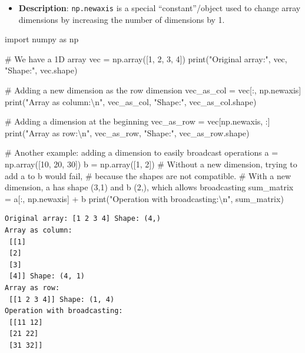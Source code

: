 \documentclass[
  english,
  letterpaper,
  DIV=11,
  numbers=noendperiod]{scrreprt}
\newenvironment{Shaded}{\begin{snugshade}}{\end{snugshade}}
\newcommand{\BuiltInTok}[1]{\textcolor[rgb]{0.00,0.23,0.31}{#1}}
\newcommand{\CharTok}[1]{\textcolor[rgb]{0.13,0.47,0.30}{#1}}
\newcommand{\CommentTok}[1]{\textcolor[rgb]{0.37,0.37,0.37}{#1}}
\newcommand{\DecValTok}[1]{\textcolor[rgb]{0.68,0.00,0.00}{#1}}
\newcommand{\ImportTok}[1]{\textcolor[rgb]{0.00,0.46,0.62}{#1}}
\newcommand{\NormalTok}[1]{\textcolor[rgb]{0.00,0.23,0.31}{#1}}
\newcommand{\OperatorTok}[1]{\textcolor[rgb]{0.37,0.37,0.37}{#1}}
\newcommand{\StringTok}[1]{\textcolor[rgb]{0.13,0.47,0.30}{#1}}
\providecommand{\tightlist}{%
  \setlength{\itemsep}{0pt}\setlength{\parskip}{0pt}}
\begin{document}
\begin{itemize}
\tightlist
\item
  \textbf{Description}: \texttt{np.newaxis} is a special
  ``constant''/object used to change array dimensions by increasing the
  number of dimensions by 1.
\end{itemize}

\begin{Shaded}
\begin{Highlighting}[]
\ImportTok{import}\NormalTok{ numpy }\ImportTok{as}\NormalTok{ np}

\CommentTok{\# We have a 1D array}
\NormalTok{vec }\OperatorTok{=}\NormalTok{ np.array([}\DecValTok{1}\NormalTok{, }\DecValTok{2}\NormalTok{, }\DecValTok{3}\NormalTok{, }\DecValTok{4}\NormalTok{])}
\BuiltInTok{print}\NormalTok{(}\StringTok{"Original array:"}\NormalTok{, vec, }\StringTok{"Shape:"}\NormalTok{, vec.shape)}

\CommentTok{\# Adding a new dimension as the row dimension}
\NormalTok{vec\_as\_col }\OperatorTok{=}\NormalTok{ vec[:, np.newaxis]}
\BuiltInTok{print}\NormalTok{(}\StringTok{"Array as column:}\CharTok{\textbackslash{}n}\StringTok{"}\NormalTok{, vec\_as\_col, }\StringTok{"Shape:"}\NormalTok{, vec\_as\_col.shape)}

\CommentTok{\# Adding a dimension at the beginning}
\NormalTok{vec\_as\_row }\OperatorTok{=}\NormalTok{ vec[np.newaxis, :]}
\BuiltInTok{print}\NormalTok{(}\StringTok{"Array as row:}\CharTok{\textbackslash{}n}\StringTok{"}\NormalTok{, vec\_as\_row, }\StringTok{"Shape:"}\NormalTok{, vec\_as\_row.shape)}

\CommentTok{\# Another example: adding a dimension to easily broadcast operations}
\NormalTok{a }\OperatorTok{=}\NormalTok{ np.array([}\DecValTok{10}\NormalTok{, }\DecValTok{20}\NormalTok{, }\DecValTok{30}\NormalTok{])}
\NormalTok{b }\OperatorTok{=}\NormalTok{ np.array([}\DecValTok{1}\NormalTok{, }\DecValTok{2}\NormalTok{])}
\CommentTok{\# Without a new dimension, trying to add a to b would fail,}
\CommentTok{\# because the shapes are not compatible.}
\CommentTok{\# With a new dimension, a has shape (3,1) and b (2,), which allows broadcasting}
\NormalTok{sum\_matrix }\OperatorTok{=}\NormalTok{ a[:, np.newaxis] }\OperatorTok{+}\NormalTok{ b}
\BuiltInTok{print}\NormalTok{(}\StringTok{"Operation with broadcasting:}\CharTok{\textbackslash{}n}\StringTok{"}\NormalTok{, sum\_matrix)}
\end{Highlighting}
\end{Shaded}

\begin{verbatim}
Original array: [1 2 3 4] Shape: (4,)
Array as column:
 [[1]
 [2]
 [3]
 [4]] Shape: (4, 1)
Array as row:
 [[1 2 3 4]] Shape: (1, 4)
Operation with broadcasting:
 [[11 12]
 [21 22]
 [31 32]]
\end{verbatim}
\end{document}
